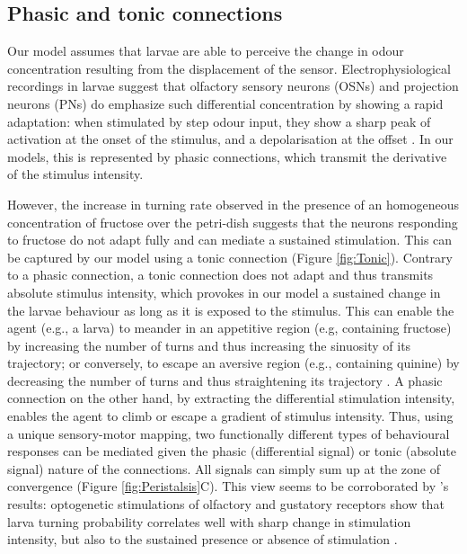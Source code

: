 \documentclass[11pt,a4paper]{article}
\begin{document}
\subsection{Phasic and tonic connections}
Our model assumes that larvae are able to perceive the change in odour concentration resulting from the displacement of the sensor. Electrophysiological recordings in larvae suggest that olfactory sensory neurons (OSNs) \citep{nagel2011biophysical,schulze2015dynamical} and projection neurons (PNs) do emphasize such differential concentration by showing a rapid adaptation: when stimulated by step odour input, they show a sharp peak of activation at the onset of the stimulus, and a depolarisation at the offset \citep{schulze2015dynamical}. In our models, this is represented by phasic connections, which transmit the derivative of the stimulus intensity.  

However, the increase in turning rate observed in the presence of an homogeneous concentration of fructose over the petri-dish \cite{schleyer2015learning} suggests that the neurons responding to fructose do not adapt fully and can mediate a sustained stimulation. This can be captured by our model using a tonic connection (Figure \ref{fig:Tonic}). Contrary to a phasic connection, a tonic connection does not adapt and thus transmits absolute stimulus intensity, which provokes in our model a sustained change in the larvae behaviour as long as it is exposed to the stimulus. This can enable the agent (e.g., a larva) to meander in an appetitive region (e.g, containing fructose) by increasing the number of turns and thus increasing the sinuosity of its trajectory; or conversely, to escape an aversive region (e.g., containing quinine) by decreasing the number of turns and thus straightening its trajectory \citep{benhamou1989animals}. A phasic connection on the other hand, by extracting the differential stimulation intensity, enables the agent to climb or escape a gradient of stimulus intensity. Thus, using a unique sensory-motor mapping, two functionally different types of behavioural responses can be mediated given the phasic (differential signal) or tonic (absolute signal) nature of the connections. All signals can simply sum up at the zone of convergence (Figure \ref{fig:Peristalsis}C). This view seems to be corroborated by \cite{hernandez2015reverse}'s results: optogenetic stimulations of olfactory and gustatory receptors show that larva turning probability correlates well with sharp change in stimulation intensity, but also to the sustained presence or absence of stimulation \citep{gepner2015computations,hernandez2015reverse}.
\end{document}
